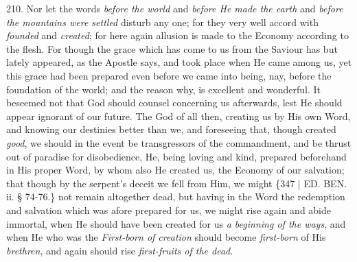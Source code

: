 210. Nor let the words \emph{before
the world} and \emph{before He made the earth} and \emph{before the
mountains were settled} disturb any one; for they very well accord
with \emph{founded} and \emph{created}; for here again allusion is
made to the Economy according to the flesh. For though the grace which
has come to us from the Saviour has but lately appeared, as the
Apostle says, and took place when He came among us, yet this grace had
been prepared even before we came into being, nay, before the
foundation of the world; and the reason why, is excellent and
wonderful. It beseemed not that God should counsel concerning us
afterwards, lest He should appear ignorant of our future. The God of
all then, creating us by His own Word, and knowing our destinies
better than we, and foreseeing that, though created \emph{good}, we
should in the event be transgressors of the commandment, and be thrust
out of paradise for disobedience, He, being loving and kind, prepared
beforehand in His proper Word, by whom also He created us, the Economy
of our salvation; that though by the serpent's deceit we fell from
Him, we might \{347 | ED.
BEN. ii. § 74-76.\} not remain altogether dead,
but having in the Word the redemption and salvation which was afore
prepared for us, we might rise again and abide immortal, when He
should have been created for us \emph{a beginning of the ways}, and
when He who was the \emph{First-born of creation} should become \emph{first-born}
of His \emph{brethren}, and again should rise \emph{first-fruits of the
dead}.

